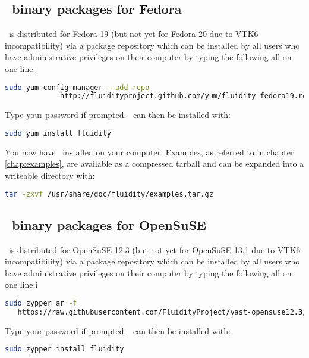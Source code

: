\subsection{\fluidity\ binary packages for Fedora}

\fluidity\ is distributed for Fedora 19 (but not yet for Fedora 20 due to VTK6
incompatibility) via a package repository which can be installed by all users
who have administrative privileges on their computer by typing the following
all on one line:

\begin{lstlisting}[language=Bash]
sudo yum-config-manager --add-repo
             http://fluidityproject.github.com/yum/fluidity-fedora19.repo
\end{lstlisting}

Type your password if prompted. \fluidity\ can then be installed with:

\begin{lstlisting}[language=Bash]
sudo yum install fluidity
\end{lstlisting}

You now have \fluidity\ installed on your computer. Examples, as referred to in
chapter \ref{chap:examples}, are available as a compressed tarball and can be
expanded into a writeable directory with:

\begin{lstlisting}[language=Bash]
tar -zxvf /usr/share/doc/fluidity/examples.tar.gz
\end{lstlisting}

\subsection{\fluidity\ binary packages for OpenSuSE}

\fluidity\ is distributed for OpenSuSE 12.3 (but not yet for OpenSuSE 13.1 due to VTK6
incompatibility) via a package repository which can be installed by all users
who have administrative privileges on their computer by typing the following
all on one line:i

\begin{lstlisting}[language=Bash]
sudo zypper ar -f
   https://raw.githubusercontent.com/FluidityProject/yast-opensuse12.3/master/
\end{lstlisting}

Type your password if prompted. \fluidity\ can then be installed with:

\begin{lstlisting}[language=Bash]
sudo zypper install fluidity
\end{lstlisting}

